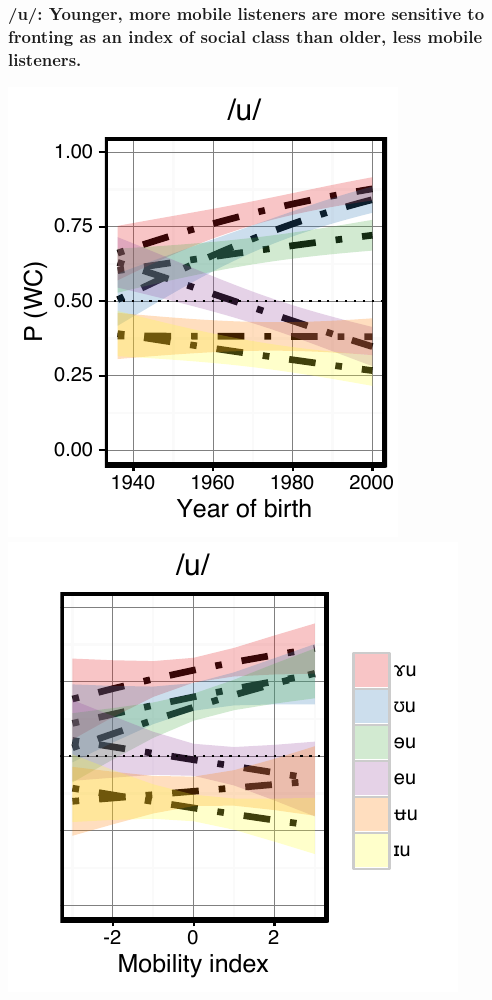 \documentclass[a0,portrait]{a0poster}
\begin{document}
\begin{multicols}{4}
\subsubsection*{/u/: Younger, more mobile listeners are more sensitive to fronting as an index of social class than older, less mobile listeners.}
\hspace*{-1.5cm}
\includegraphics[scale=2]{u_perception_age_sd.pdf}
\includegraphics[scale=2]{u_perception_dim3_sd.pdf}
\vspace*{-1.5cm}

\end{multicols}
\end{document}
